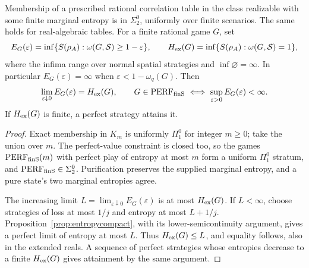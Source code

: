 \begin{corollary}\label{cor:entropybudget}
Membership of a prescribed rational correlation table in the class
realizable with some finite marginal entropy is in $\Sigma^0_2$,
uniformly over finite scenarios. The same holds for real-algebraic tables.
For a finite rational game $G$, set
\[
 E_G(\varepsilon)=\inf\{S(\rho_A):\omega(G,\mathcal S)\ge1-\varepsilon\},
 \qquad H_{\rm ex}(G)=\inf\{S(\rho_A):\omega(G,\mathcal S)=1\},
\]
where the infima range over normal spatial strategies and
$\inf\varnothing=\infty$. In particular $E_G(\varepsilon)=\infty$ when
$\varepsilon<1-\omega_q(G)$. Then
\[
 \lim_{\varepsilon\downarrow0}E_G(\varepsilon)=H_{\rm ex}(G),\qquad
 G\in\mathrm{PERF}_{\mathrm{finS}}\ \Longleftrightarrow\
 \sup_{\varepsilon>0}E_G(\varepsilon)<\infty.
\]
If $H_{\rm ex}(G)$ is finite, a perfect strategy attains it.
\end{corollary}
\begin{proof}
Exact membership in $K_m$ is uniformly $\Pi^0_1$ for integer $m\ge0$;
take the union over $m$. The perfect-value constraint is closed too,
so the games $\mathrm{PERF}_{\mathrm{finS}}(m)$ with perfect play of entropy at most $m$
form a uniform $\Pi^0_1$ stratum, and $\mathrm{PERF}_{\mathrm{finS}}\in\Sigma^0_2$.
Purification preserves the supplied marginal
entropy, and a pure state's two marginal entropies agree.

The increasing limit $L=\lim_{\varepsilon\downarrow0}E_G(\varepsilon)$
is at most $H_{\rm ex}(G)$. If $L<\infty$, choose strategies of loss at most
$1/j$ and entropy at most $L+1/j$. Proposition~\ref{prop:entropycompact},
with its lower-semicontinuity argument, gives a perfect limit of entropy
at most $L$. Thus $H_{\rm ex}(G)\le L$, and equality follows, also in the
extended reals. A sequence of perfect strategies whose entropies decrease
to a finite $H_{\rm ex}(G)$ gives attainment by the same argument.
\end{proof}

